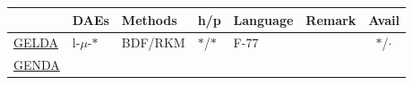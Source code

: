 \documentclass[]{book}
\theoremstyle{definition}
\theoremstyle{definition}
\theoremstyle{definition}
\theoremstyle{remark}
\begin{document}
\begin{longtable}[]{@{}llllllc@{}}
\toprule
\begin{minipage}[b]{0.06\columnwidth}\raggedright
\strut
\end{minipage} & \begin{minipage}[b]{0.06\columnwidth}\raggedright
DAEs\strut
\end{minipage} & \begin{minipage}[b]{0.10\columnwidth}\raggedright
Methods\strut
\end{minipage} & \begin{minipage}[b]{0.05\columnwidth}\raggedright
h/p\strut
\end{minipage} & \begin{minipage}[b]{0.06\columnwidth}\raggedright
Language\strut
\end{minipage} & \begin{minipage}[b]{0.41\columnwidth}\raggedright
Remark\strut
\end{minipage} & \begin{minipage}[b]{0.05\columnwidth}\centering
Avail\strut
\end{minipage}\tabularnewline
\midrule
\endhead
\begin{minipage}[t]{0.06\columnwidth}\raggedright
\href{https://doi.org/10.1137/S1064827595286347}{GELDA}\strut
\end{minipage} & \begin{minipage}[t]{0.06\columnwidth}\raggedright
l-\(\mu\)-\(*\)\strut
\end{minipage} & \begin{minipage}[t]{0.10\columnwidth}\raggedright
BDF/RKM\strut
\end{minipage} & \begin{minipage}[t]{0.05\columnwidth}\raggedright
\(*\)/\(*\)\strut
\end{minipage} & \begin{minipage}[t]{0.06\columnwidth}\raggedright
F-77\strut
\end{minipage} & \begin{minipage}[t]{0.41\columnwidth}\raggedright
\strut
\end{minipage} & \begin{minipage}[t]{0.05\columnwidth}\centering
\(*\)/\(\cdot\)\strut
\end{minipage}\tabularnewline
\begin{minipage}[t]{0.06\columnwidth}\raggedright
\href{https://www3.math.tu-berlin.de/cgi-bin/IfM/show_abstract.cgi?Report-730-2002.rdf.html}{GENDA}\strut

\end{minipage}
\end{longtable}
\end{document}

